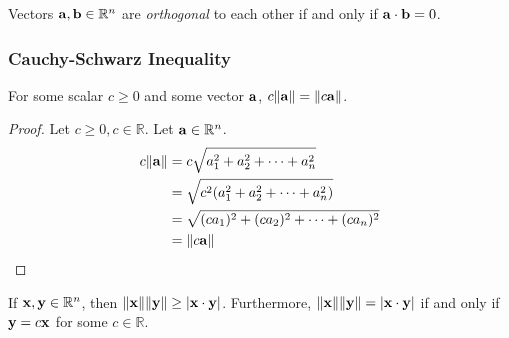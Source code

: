 \documentclass[../main.tex]{subfiles}
\begin{document}
\begin{definition}[Orthogonal]
	Vectors $\mathbf{a}, \mathbf{b} \in \mathbb{R}^n$ are \textit{orthogonal} to each other if and only if $\mathbf{a}\cdot\mathbf{b}=0$.
\end{definition}

\subsubsection{Cauchy-Schwarz Inequality}

\begin{lemma}
	For some scalar $c \geq 0$ and some vector $\mathbf{a}$, $c\|\mathbf{a}\|=\|c\mathbf{a}\|$.
\end{lemma}

\begin{proof}
	Let $c \geq 0, c \in \mathbb{R}$. Let $\mathbf{a} \in \mathbb{R}^n$.
	\begin{align*}
		c\|\mathbf{a}\| & = c\sqrt{a_1^2+a_2^2+\dots +a_n^2}         \\
		              & = \sqrt{c^2(a_1^2+a_2^2+\dots +a_n^2)}     \\
		              & = \sqrt{(ca_1)^2+(ca_2)^2+\dots +(ca_n)^2} \\
		              & = \|c\mathbf{a}\|
	\end{align*}
\end{proof}

\begin{theorem} \label{cauchy_schwarz}
	If $\mathbf{x}, \mathbf{y} \in \mathbb{R}^n$, then
	$\|\mathbf{x}\|\|\mathbf{y}\| \geq |\mathbf{x}\cdot\mathbf{y}|$. Furthermore,
	$\|\mathbf{x}\|\|\mathbf{y}\|=|\mathbf{x}\cdot\mathbf{y}|$ if and only if $\mathbf{y}=c\mathbf{x}$
	for some $c \in \mathbb{R}$.
\end{theorem}
\end{document}
